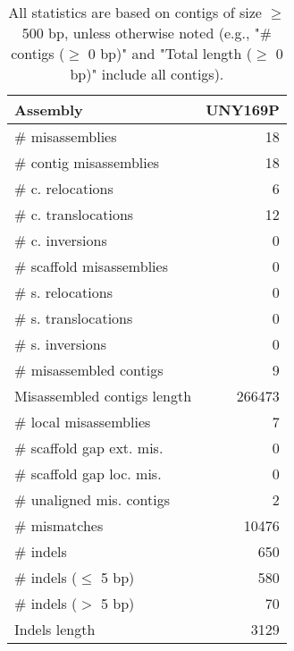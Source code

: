 \documentclass[12pt,a4paper]{article}
\begin{document}
\begin{table}[ht]
\begin{center}
\caption{All statistics are based on contigs of size $\geq$ 500 bp, unless otherwise noted (e.g., "\# contigs ($\geq$ 0 bp)" and "Total length ($\geq$ 0 bp)" include all contigs).}
\begin{tabular}{|l*{1}{|r}|}
\hline
Assembly & UNY169P \\ \hline
\# misassemblies & 18 \\ \hline
\hspace{2mm}\# contig misassemblies & 18 \\ \hline
\hspace{5mm}\# c. relocations & 6 \\ \hline
\hspace{5mm}\# c. translocations & 12 \\ \hline
\hspace{5mm}\# c. inversions & 0 \\ \hline
\hspace{2mm}\# scaffold misassemblies & 0 \\ \hline
\hspace{5mm}\# s. relocations & 0 \\ \hline
\hspace{5mm}\# s. translocations & 0 \\ \hline
\hspace{5mm}\# s. inversions & 0 \\ \hline
\# misassembled contigs & 9 \\ \hline
Misassembled contigs length & 266473 \\ \hline
\# local misassemblies & 7 \\ \hline
\# scaffold gap ext. mis. & 0 \\ \hline
\# scaffold gap loc. mis. & 0 \\ \hline
\# unaligned mis. contigs & 2 \\ \hline
\# mismatches & 10476 \\ \hline
\# indels & 650 \\ \hline
\hspace{5mm}\# indels ($\leq$ 5 bp) & 580 \\ \hline
\hspace{5mm}\# indels ($>$ 5 bp) & 70 \\ \hline
Indels length & 3129 \\ \hline
\end{tabular}
\end{center}
\end{table}
\end{document}
